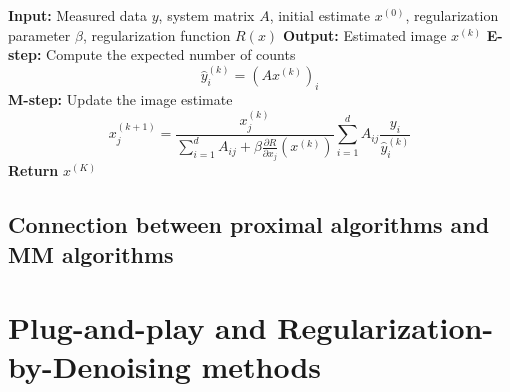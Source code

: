\begin{algorithm}
    \caption{One-Step Late Algorithm (OSL)}
    \begin{algorithmic}[1]
    \State \textbf{Input:} Measured data $y$, system matrix $A$, initial estimate $x^{(0)}$, regularization parameter $\beta$, regularization function $R(x)$
    \State \textbf{Output:} Estimated image $x^{(k)}$
        \State \textbf{E-step:} Compute the expected number of counts
        \begin{equation*}
            \hat{y}_i^{(k)} = (Ax^{(k)})_i
        \end{equation*}
        \State \textbf{M-step:} Update the image estimate
        \begin{equation*}
            x_j^{(k+1)} = \frac{x_j^{(k)}}{\sum_{i=1}^{d} A_{ij} + \beta \frac{\partial R}{\partial x_j}(x^{(k)})} \sum_{i=1}^{d} A_{ij} \frac{y_i}{\hat{y}_i^{(k)}}
        \end{equation*}
    \EndFor
    \State \textbf{Return} $x^{(K)}$
    \end{algorithmic}
    \label{alg:osl}
\end{algorithm}

\subsection{Connection between proximal algorithms and MM algorithms}

\section{Plug-and-play and Regularization-by-Denoising methods}
